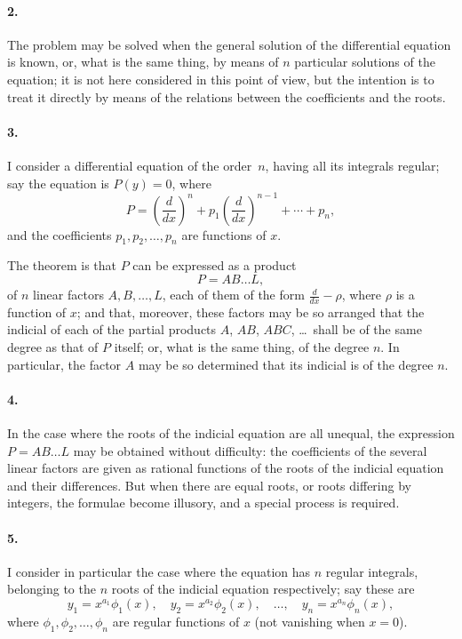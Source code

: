 \documentclass[11pt,a4paper]{book}
\begin{document}
\paragraph{2.} The problem may be solved when the general solution of the differential equation is known, or, what is the same thing, by means of $n$ particular solutions of the equation; it is not here considered in this point of view, but the intention is to treat it directly by means of the relations between the coefficients and the roots.

\paragraph{3.} I consider a differential equation of the order~$n$, having all its integrals regular; say the equation is $P(y) = 0$, where
\[
P = \left(\frac{d}{dx}\right)^{n} + p_{1}\left(\frac{d}{dx}\right)^{n-1} + \cdots + p_{n},
\]
and the coefficients $p_{1}, p_{2}, \ldots, p_{n}$ are functions of $x$.

\newpage

The theorem is that $P$ can be expressed as a product
\[
P = AB\ldots L,
\]
of $n$ linear factors $A, B, \ldots, L$, each of them of the form $\frac{d}{dx} - \rho$, where $\rho$ is a function of $x$; and that, moreover, these factors may be so arranged that the indicial of each of the partial products $A$, $AB$, $ABC$, \ldots\ shall be of the same degree as that of $P$ itself; or, what is the same thing, of the degree $n$. In particular, the factor $A$ may be so determined that its indicial is of the degree $n$.

\paragraph{4.} In the case where the roots of the indicial equation are all unequal, the expression $P = AB\ldots L$ may be obtained without difficulty: the coefficients of the several linear factors are given as rational functions of the roots of the indicial equation and their differences. But when there are equal roots, or roots differing by integers, the formulae become illusory, and a special process is required.

\paragraph{5.} I consider in particular the case where the equation has $n$ regular integrals, belonging to the $n$ roots of the indicial equation respectively; say these are
\[
y_{1} = x^{a_{1}}\phi_{1}(x), \quad y_{2} = x^{a_{2}}\phi_{2}(x), \quad \ldots, \quad y_{n} = x^{a_{n}}\phi_{n}(x),
\]
where $\phi_{1}, \phi_{2}, \ldots, \phi_{n}$ are regular functions of $x$ (not vanishing when $x=0$).
\end{document}
